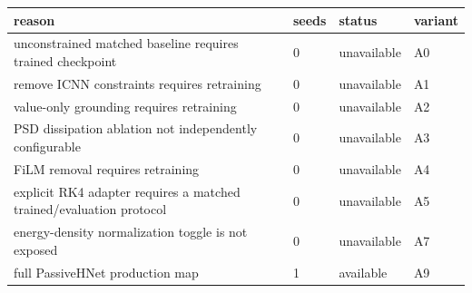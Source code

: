 \begin{tabular}{llll}
 \toprule
reason & seeds & status & variant \\ \midrule
unconstrained matched baseline requires trained checkpoint & 0 & unavailable & A0 \\
remove ICNN constraints requires retraining & 0 & unavailable & A1 \\
value-only grounding requires retraining & 0 & unavailable & A2 \\
PSD dissipation ablation not independently configurable & 0 & unavailable & A3 \\
FiLM removal requires retraining & 0 & unavailable & A4 \\
explicit RK4 adapter requires a matched trained/evaluation protocol & 0 & unavailable & A5 \\
energy-density normalization toggle is not exposed & 0 & unavailable & A7 \\
full PassiveHNet production map & 1 & available & A9 \\
\bottomrule
\end{tabular}